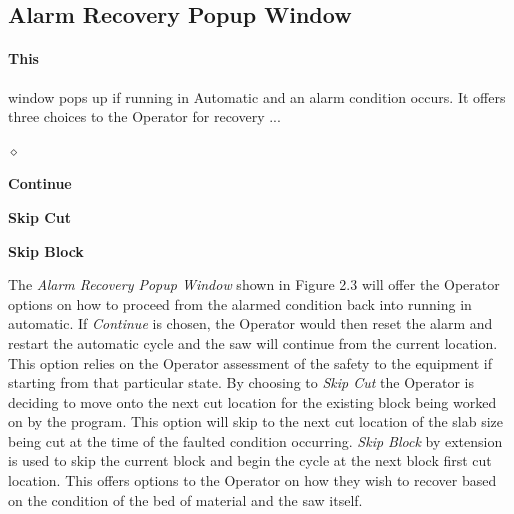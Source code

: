 \subsection{Alarm Recovery Popup Window} \paragraph*{This}window pops up if running in Automatic and an alarm condition occurs. It offers three choices to the Operator for recovery ... 
\begin{list}{$\diamond$}{}
	\item \textbf{Continue}
	\item \textbf{Skip Cut}
	\item \textbf{Skip Block}
\end{list}
The \textit{Alarm Recovery Popup Window} shown in Figure 2.3 will offer the Operator options on how to proceed from the alarmed condition back into running in automatic. If \textit{Continue} is chosen, the Operator would then reset the alarm and restart the automatic cycle and the saw will continue from the current location. This option relies on the Operator assessment of the safety to the equipment if starting from that particular state. By choosing to \textit{Skip Cut} the Operator is deciding to move onto the next cut location for the existing block being worked on by the program. This option will skip to the next cut location of the slab size being cut at the time of the faulted condition occurring. \textit{Skip Block} by extension is used to skip the current block and begin the cycle at the next block first cut location. This offers options to the Operator on how they wish to recover based on the condition of the bed of material and the saw itself.
\pagebreak

